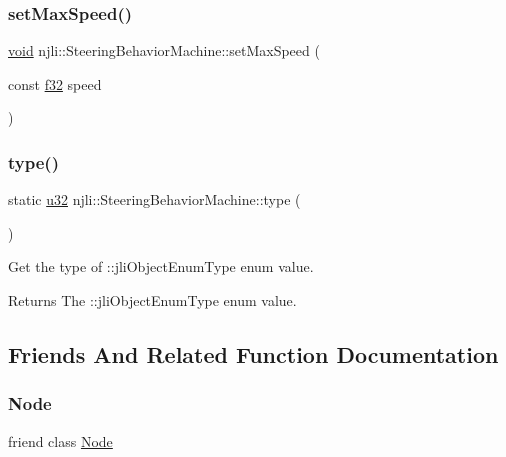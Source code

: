 \subsubsection{\texorpdfstring{set\+Max\+Speed()}{setMaxSpeed()}}
{\footnotesize\ttfamily \mbox{\hyperlink{_thread_8h_af1e856da2e658414cb2456cb6f7ebc66}{void}} njli\+::\+Steering\+Behavior\+Machine\+::set\+Max\+Speed (\begin{DoxyParamCaption}\item[{const \mbox{\hyperlink{_util_8h_a5f6906312a689f27d70e9d086649d3fd}{f32}}}]{speed }\end{DoxyParamCaption})}

\mbox{\label{classnjli_1_1_steering_behavior_machine_ab193f59f5f0a3ba81703678bd9b14e8b}} 
\subsubsection{\texorpdfstring{type()}{type()}}
{\footnotesize\ttfamily static \mbox{\hyperlink{_util_8h_a10e94b422ef0c20dcdec20d31a1f5049}{u32}} njli\+::\+Steering\+Behavior\+Machine\+::type (\begin{DoxyParamCaption}{ }\end{DoxyParamCaption})\hspace{0.3cm}{\ttfamily [static]}}

Get the type of \+::jli\+Object\+Enum\+Type enum value.

\begin{DoxyReturn}{Returns}
The \+::jli\+Object\+Enum\+Type enum value. 
\end{DoxyReturn}


\subsection{Friends And Related Function Documentation}
\mbox{\label{classnjli_1_1_steering_behavior_machine_a6db9d28bd448a131448276ee03de1e6d}} 
\subsubsection{\texorpdfstring{Node}{Node}}
{\footnotesize\ttfamily friend class \mbox{\hyperlink{classnjli_1_1_node}{Node}}\hspace{0.3cm}{\ttfamily [friend]}}



